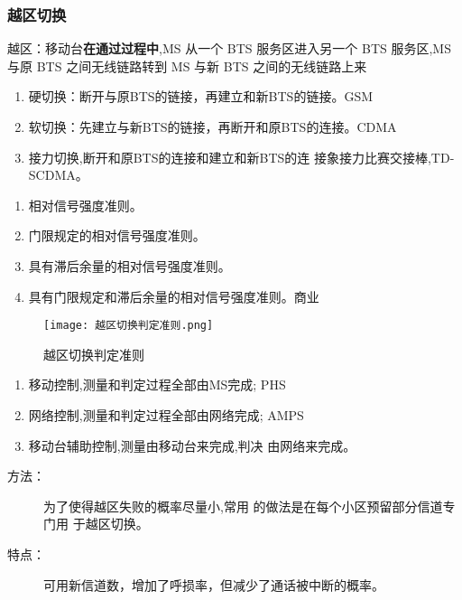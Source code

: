	\subsubsection{越区切换}
	{越区：移动台\textbf{在通过过程中},MS 从一个 BTS 服务区进入另一个 BTS 服务区,MS 与原 BTS 之间无线链路转到 MS 与新 BTS 之间的无线链路上来}
	\begin{enumerate}
		\item 硬切换：断开与原BTS的链接，再建立和新BTS的链接。GSM
		\item 软切换：先建立与新BTS的链接，再断开和原BTS的连接。CDMA
		\item 接力切换,断开和原BTS的连接和建立和新BTS的连
		接象接力比赛交接棒,TD-SCDMA。
	\end{enumerate}
	\begin{minipage}{0.5\linewidth} 
		\begin{enumerate}
			\item 相对信号强度准则。
			\item 门限规定的相对信号强度准则。
			\item 具有滞后余量的相对信号强度准则。
			\item 具有门限规定和滞后余量的相对信号强度准则。商业
		\end{enumerate}
	\end{minipage}
	\begin{minipage}{0.5\linewidth}
		\begin{figure}[H]
			\centering
			\texttt{[image: 越区切换判定准则.png]}
			\caption{越区切换判定准则}
		\end{figure}
	\end{minipage}
	
	\begin{enumerate}
		\item 移动控制,测量和判定过程全部由MS完成;
		PHS
		\item 网络控制,测量和判定过程全部由网络完成;
		AMPS
		\item 移动台辅助控制,测量由移动台来完成,判决
		由网络来完成。
	\end{enumerate}
	\begin{description}
		\item[方法：] 为了使得越区失败的概率尽量小,常用
		的做法是在每个小区预留部分信道专门用
		于越区切换。
		\item [特点：] 可用新信道数，增加了呼损率，但减少了通话被中断的概率。
	\end{description}

